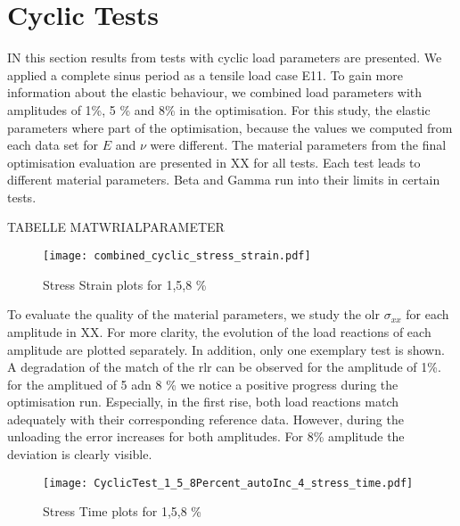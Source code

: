 





\section{Cyclic Tests}
IN this section results from tests with cyclic load parameters are presented. We applied a complete sinus period as a tensile load case E11. To gain more information about the elastic behaviour, we combined load parameters with amplitudes of 1\%, 5 \% and 8\% in the optimisation. For this study, the elastic parameters where part of the optimisation, because the values we computed from each data set for $E$ and $\nu$ were different. The material parameters from the final optimisation evaluation are presented in XX for all tests. Each test leads to different material parameters. Beta and Gamma run into their limits in certain tests. 

TABELLE MATWRIALPARAMETER

\begin{figure}[H]
    \centering
    \texttt{[image: combined\_cyclic\_stress\_strain.pdf]}
    \caption{Stress Strain plots for 1,5,8 \%}
    \label{fig:cycliclStressStrain}
\end{figure}

To evaluate the quality of the material parameters, we study the \acrlong{olr} $\sigma_{xx}$ for each amplitude in XX. For more clarity, the evolution of the load reactions of each amplitude are plotted separately. In addition, only one exemplary test is shown. A degradation of the match of the \acrlong{rlr} can be observed for the amplitude of 1\%. for the amplitued of 5 adn 8 \% we notice a positive progress during the optimisation run. Especially, in the first rise, both load reactions match adequately with their corresponding reference data. However, during the unloading the error increases for both amplitudes. For 8\% amplitude the deviation is clearly visible. 
\begin{figure}[H]
    \centering
    \texttt{[image: CyclicTest\_1\_5\_8Percent\_autoInc\_4\_stress\_time.pdf]}
    \caption{Stress Time plots for 1,5,8 \%}
    \label{fig:cyclicSterssTime}
\end{figure}

